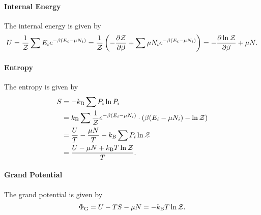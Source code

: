 \paragraph{Internal Energy}
The internal energy is given by
\begin{align*}
	U = \frac{1}{\mathcal{Z}}\sum E_{i}e^{-\beta(E_{i} - \mu N_{i})} = \frac{1}{\mathcal{Z}}\left(-\pdv{\mathcal{Z}}{\beta} + \sum\mu N_{i}e^{-\beta(E_{i} - \mu N_{i})}\right) = -\pdv{\ln{\mathcal{Z}}}{\beta} + \mu N.
\end{align*}

\paragraph{Entropy}
The entropy is given by
\begin{align*}
	S &= -k_{\text{B}}\sum P_{i}\ln{P_{i}} \\
	  &= k_{\text{B}}\sum \frac{1}{\mathcal{Z}}e^{-\beta(E_{i} - \mu N_{i})}\cdot\left(\beta(E_{i} - \mu N_{i}) - \ln{\mathcal{Z}}\right) \\
	  &= \frac{U}{T} - \frac{\mu N}{T} - k_{\text{B}}\sum P_{i}\ln{\mathcal{Z}} \\
	  &= \frac{U - \mu N + k_{\text{B}} T\ln{\mathcal{Z}}}{T}.
\end{align*}

\paragraph{Grand Potential}
The grand potential is given by
\begin{align*}
	\Phi_{\text{G}} = U - TS - \mu N = -k_{\text{B}} T\ln{\mathcal{Z}}.
\end{align*}

